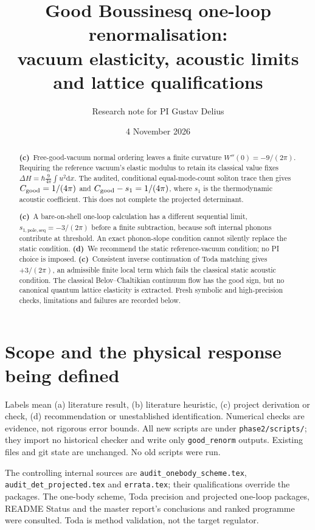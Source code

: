 \documentclass[11pt,a4paper]{article}
\title{Good Boussinesq one-loop renormalisation:\\vacuum elasticity, acoustic limits and lattice qualifications}
\author{Research note for PI Gustav Delius}
\date{4 November 2026}
\newcommand{\C}{\textbf{(c)}\ }
\newcommand{\D}{\textbf{(d)}\ }
\newcommand{\dd}{\mathrm d}
\newcommand{\file}[1]{\nolinkurl{#1}}
\begin{document}
\maketitle
\begin{abstract}
\C Free-good-vacuum normal ordering leaves a finite curvature
$W''(0)=-9/(2\pi)$. Requiring the reference vacuum's elastic modulus to
retain its classical value fixes
$\Delta H=\hbar\frac9{4\pi}\int u^2\dd x$.
The audited, conditional equal-mode-count soliton trace then gives
$C_{\rm good}=1/(4\pi)$ and $C_{\rm good}-s_1=1/(4\pi)$, where $s_1$
is the thermodynamic acoustic coefficient. This does not complete the
projected determinant.

\C A bare-on-shell one-loop calculation has a different sequential
limit, $s_{1,\mathrm{pole,seq}}=-3/(2\pi)$ before a finite subtraction,
because soft internal phonons contribute at threshold. An exact
phonon-slope condition cannot silently replace the static condition.
\D We recommend the static reference-vacuum condition; no PI choice is
imposed. \C Consistent inverse continuation of Toda matching gives
$+3/(2\pi)$, an admissible finite local term which fails the classical
static acoustic condition. The classical Belov--Chaltikian continuum
flow has the good sign, but no canonical quantum lattice elasticity is
extracted. Fresh symbolic and high-precision checks, limitations and
failures are recorded below.
\end{abstract}

\section{Scope and the physical response being defined}
Labels mean (a) literature result, (b) literature heuristic, (c) project
derivation or check, (d) recommendation or unestablished identification.
Numerical checks are evidence, not rigorous error bounds. All new scripts
are under \file{phase2/scripts/}; they import no historical checker and
write only \file{good_renorm} outputs. Existing files and git state are
unchanged. No old scripts were run.

The controlling internal sources are \file{audit_onebody_scheme.tex},
\file{audit_det_projected.tex} and \file{errata.tex}; their qualifications
override the packages. The one-body scheme, Toda precision and projected
one-loop packages, README Status and the master report's conclusions
and ranked programme were consulted. Toda is method validation, not the
target regulator.
\end{document}
